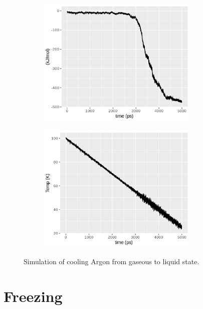 \documentclass[10pt, a4paper, oneside, twocolumn]{report}
\begin{document}
\begin{figure}
	\begin{subfigure}[HB!]{0.5\textwidth}
		\includegraphics[width=0.85\textwidth]{plots/potential_energy.png}
	\end{subfigure}
	\begin{subfigure}[HB!]{0.5\textwidth}
		\includegraphics[width=0.85\textwidth]{plots/temp_plot.png}
	\end{subfigure}
	\caption{Simulation of cooling Argon from gaseous to liquid state.}
\end{figure}

\section{Freezing}
\end{document}

